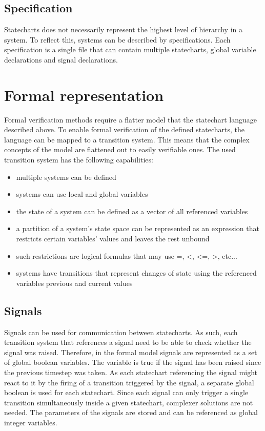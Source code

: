 {  \subsection{Specification}
Statecharts does not necessarily represent the highest level of hierarchy in a system. To reflect this, systems can be described by specifications. Each specification is a single file that can contain multiple statecharts, global variable declarations and signal declarations.
\section{Formal representation}
Formal verification methods require a flatter model that the statechart language described above. To enable formal verification of the defined statecharts, the language can be mapped to a transition system. This means that the complex concepts of the model are flattened out to easily verifiable ones. The used transition system has the following capabilities:
\begin{itemize}
  \item multiple systems can be defined
  \item systems can use local and global variables
  \item the state of a system can be defined as a vector of all referenced variables
  \item a partition of a system's state space can be represented as an expression that restricts certain variables' values and leaves the rest unbound
  \item such restrictions are logical formulas that may use =, <, <=, >, etc...
  \item systems have transitions that represent changes of state using the referenced variables previous and current values
\end{itemize}
  \subsection{Signals}
Signals can be used for communication between statecharts. As such, each transition system that references a signal need to be able to check whether the signal was raised. Therefore, in the formal model signals are represented as a set of global boolean variables. The variable is true if the signal has been raised since the previous timestep was taken. As each statechart referencing the signal might react to it by the firing of a transition triggered by the signal, a separate global boolean is used for each statechart. Since each signal can only trigger a single transition simultaneously inside a given statechart, complexer solutions are not needed. The parameters of the signals are stored and can be referenced as global integer variables.
}
